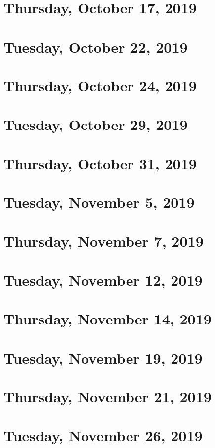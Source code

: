 \documentclass{../mynotes}
\begin{document}
\section{Thursday, October 17, 2019}
    

\section{Tuesday, October 22, 2019}
    

\section{Thursday, October 24, 2019}
    

\section{Tuesday, October 29, 2019}
    
\section{Thursday, October 31, 2019}
    
    
\section{Tuesday, November 5, 2019}
    
\section{Thursday, November 7, 2019}
    

\section{Tuesday, November 12, 2019}
    
\section{Thursday, November 14, 2019}
    
    
\section{Tuesday, November 19, 2019}
    
\section{Thursday, November 21, 2019}
    
    
\section{Tuesday, November 26, 2019}
    
\end{document}
